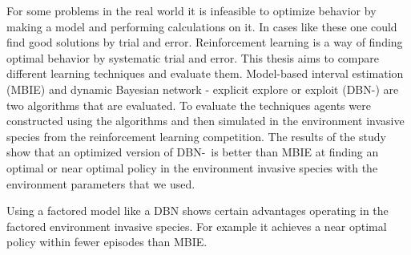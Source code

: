 
For some problems in the real world it is infeasible to optimize behavior by making a model and performing calculations on it. 
In cases like these one could find good solutions by trial and error. 
Reinforcement learning is a way of finding optimal behavior by systematic trial and error.
This thesis aims to compare different learning techniques and evaluate them. 
Model-based interval estimation (MBIE) and dynamic Bayesian network - explicit explore or exploit (DBN-\etre)
 are two algorithms that are evaluated. 
To evaluate the techniques agents were constructed using the algorithms and 
then simulated in the environment invasive species from the reinforcement learning competition.
The results of the study show that an optimized version of DBN-\etre\ is better than MBIE at finding an optimal or near optimal policy in the 
environment invasive species with the environment parameters that we used.

Using a factored model like a DBN shows certain advantages operating in 
the factored environment invasive species. For example it achieves a near optimal
policy within fewer episodes than MBIE.






